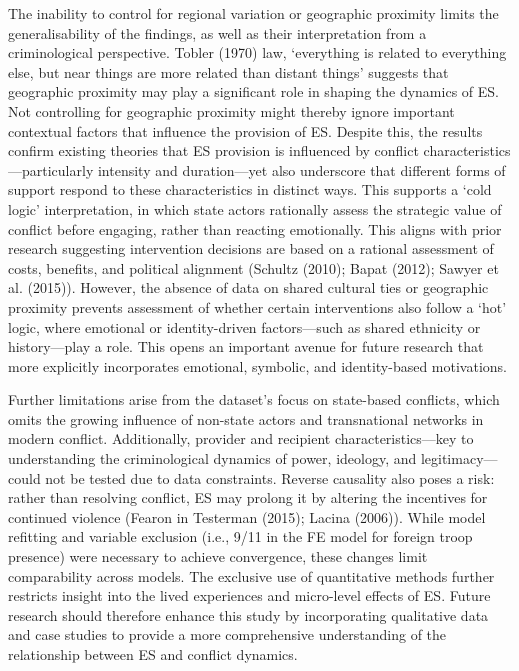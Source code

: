 \documentclass[
]{article}
\begin{document}
The inability to control for regional variation or geographic proximity
limits the generalisability of the findings, as well as their
interpretation from a criminological perspective. Tobler (1970) law,
`everything is related to everything else, but near things are more
related than distant things' suggests that geographic proximity may play
a significant role in shaping the dynamics of ES. Not controlling for
geographic proximity might thereby ignore important contextual factors
that influence the provision of ES. Despite this, the results confirm
existing theories that ES provision is influenced by conflict
characteristics---particularly intensity and duration---yet also
underscore that different forms of support respond to these
characteristics in distinct ways. This supports a `cold logic'
interpretation, in which state actors rationally assess the strategic
value of conflict before engaging, rather than reacting emotionally.
This aligns with prior research suggesting intervention decisions are
based on a rational assessment of costs, benefits, and political
alignment (Schultz (2010); Bapat (2012); Sawyer et al. (2015)). However,
the absence of data on shared cultural ties or geographic proximity
prevents assessment of whether certain interventions also follow a `hot'
logic, where emotional or identity-driven factors---such as shared
ethnicity or history---play a role. This opens an important avenue for
future research that more explicitly incorporates emotional, symbolic,
and identity-based motivations.

Further limitations arise from the dataset's focus on state-based
conflicts, which omits the growing influence of non-state actors and
transnational networks in modern conflict. Additionally, provider and
recipient characteristics---key to understanding the criminological
dynamics of power, ideology, and legitimacy---could not be tested due to
data constraints. Reverse causality also poses a risk: rather than
resolving conflict, ES may prolong it by altering the incentives for
continued violence (Fearon in Testerman (2015); Lacina (2006)). While
model refitting and variable exclusion (i.e., 9/11 in the FE model for
foreign troop presence) were necessary to achieve convergence, these
changes limit comparability across models. The exclusive use of
quantitative methods further restricts insight into the lived
experiences and micro-level effects of ES. Future research should
therefore enhance this study by incorporating qualitative data and case
studies to provide a more comprehensive understanding of the
relationship between ES and conflict dynamics.
\end{document}
